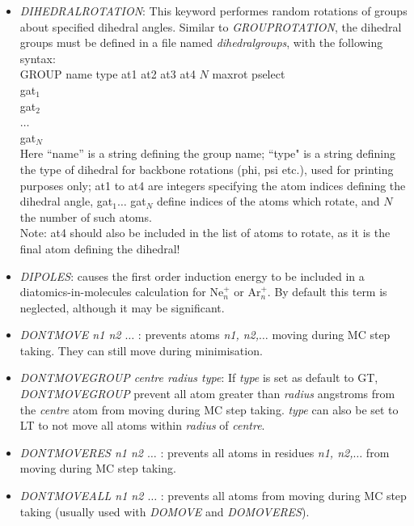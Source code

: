 \documentclass[12pt,a4paper,dvips]{article}
\begin{document}
\begin{itemize}
\item {\it DIHEDRALROTATION}: This keyword performes random rotations of groups about specified dihedral angles. Similar to {\it GROUPROTATION}, the dihedral groups must be defined in a file named {\it dihedralgroups}, with the following syntax:\\
GROUP name type at1 at2 at3 at4 $N$ maxrot pselect\\
gat$_1$\\
gat$_2$\\
$\ldots$\\
gat$_N$\\
Here ``name'' is a string defining the group name; ``type" is a string defining the type of dihedral for backbone rotations (phi, psi etc.), used for printing purposes only; at1 to at4 are integers specifying the atom indices defining the dihedral angle, gat$_1 \ldots$ gat$_N$ define indices of the atoms which rotate, and $N$ the number of such atoms.\\
Note: at4 should also be included in the list of atoms to rotate, as it is the final atom defining the dihedral!

\item {\it DIPOLES\/}: causes the first order induction energy to be included
in a diatomics-in-molecules calculation for Ne$^+_n$ or Ar$^+_n$. By default this
term is neglected, although it may be significant.

\item {\it DONTMOVE n1 n2 $\ldots$ \/}: prevents atoms {\it n1, n2,$\ldots$} moving during MC step taking. They can still move during minimisation.

\item {\it DONTMOVEGROUP centre radius type\/}: If {\it type} is set as default to {\textrm GT}, {\it DONTMOVEGROUP\/} prevent all atom greater than {\it radius} angstroms from the {\it centre} atom from moving during MC step taking. {\it type} can also be set to LT to not move all atoms within {\it radius} of {\it centre}.

\item {\it DONTMOVERES n1 n2 $\ldots$ \/}: prevents all atoms in residues {\it n1, n2,$\ldots$} from moving during MC step taking.

\item {\it DONTMOVEALL n1 n2 $\ldots$ \/}: prevents all atoms from moving during MC step taking (usually used with {\it DOMOVE} and {\it DOMOVERES}). 


\end{itemize}
\end{document}
